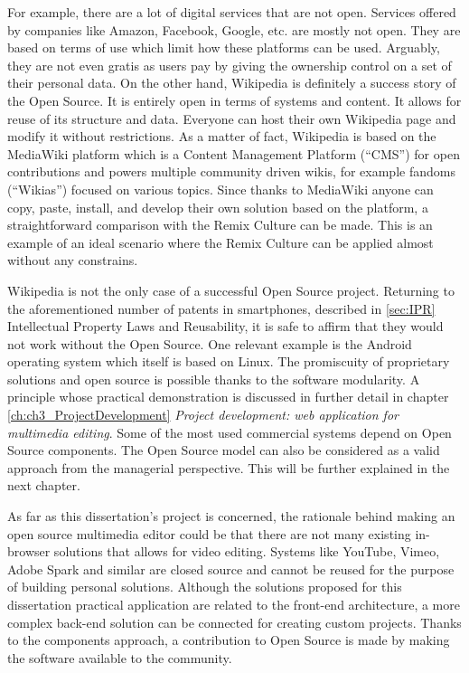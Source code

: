For example, there are a lot of digital services that are not open. Services offered by companies like Amazon, Facebook, Google, etc. are mostly not open. They are based on terms of use which limit how these platforms can be used. Arguably, they are not even gratis as users pay by giving the ownership control on a set of their personal data.
On the other hand, Wikipedia is definitely a success story of the Open Source. It is entirely open in terms of systems and content. It allows for reuse of its structure and data. Everyone can host their own Wikipedia page and modify it without restrictions. As a matter of fact, Wikipedia is based on the MediaWiki platform which is a Content Management Platform (“CMS”) for open contributions and powers multiple community driven wikis, for example fandoms (“Wikias”) focused on various topics. Since thanks to MediaWiki anyone can copy, paste, install, and develop their own solution based on the platform, a straightforward comparison with the Remix Culture can be made. This is an example of an ideal scenario where the Remix Culture can be applied almost without any constrains.

Wikipedia is not the only case of a successful Open Source project. Returning to the aforementioned number of patents in smartphones, described in \ref{sec:IPR} Intellectual Property Laws and Reusability, it is safe to affirm that they would not work without the Open Source. One relevant example is the Android operating system which itself is based on Linux. The promiscuity of proprietary solutions and open source is possible thanks to the software modularity. A principle whose practical demonstration is discussed in further detail in chapter \ref{ch:ch3_ProjectDevelopment} \emph{Project development: web application for multimedia editing}. Some of the most used commercial systems depend on Open Source components. The Open Source model can also be considered as a valid approach from the managerial perspective. This will be further explained in the next chapter.

As far as this dissertation’s project is concerned, the rationale behind making an open source multimedia editor could be that there are not many existing in-browser solutions that allows for video editing. Systems like YouTube, Vimeo, Adobe Spark and similar are closed source and cannot be reused for the purpose of building personal solutions. Although the solutions proposed for this dissertation practical application are related to the front-end architecture, a more complex back-end solution can be connected for creating custom projects. Thanks to the components approach, a contribution to Open Source is made by making the software available to the community.

